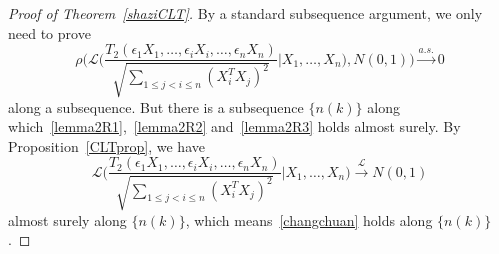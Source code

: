 \documentclass[review]{elsarticle}
\theoremstyle{plain}
\theoremstyle{definition}
\theoremstyle{remark}
\begin{document}
\begin{proof}[Proof of Theorem~\ref{shaziCLT}]
By a standard subsequence argument, we only need to prove 
    \begin{equation}\label{changchuan}
        \rho\Big(\mathcal{L}\Big(\frac{T_2(\epsilon_1 X_1,\ldots, \epsilon_i X_i,\ldots,\epsilon_n X_n)}{\sqrt{\sum_{1\leq j<i\leq n}{(X_i^T X_j)}^2}}\Big|X_1,\ldots,X_n\Big),N(0,1)\Big)\xrightarrow{a.s.} 0
    \end{equation}
     along a subsequence.
    But there is a subsequence $\{n(k)\}$ along which~\eqref{lemma2R1},~\eqref{lemma2R2} and~\eqref{lemma2R3} holds almost surely.
    By Proposition~\ref{CLTprop}, we have
    \begin{equation}
        \mathcal{L}\Big(\frac{T_2(\epsilon_1 X_1,\ldots, \epsilon_i X_i,\ldots,\epsilon_n X_n)}{\sqrt{\sum_{1\leq j<i\leq n}{(X_i^T X_j)}^2}}\Big|X_1,\ldots,X_n\Big)\xrightarrow{\mathcal{L}}N(0,1)
    \end{equation}
    almost surely along $\{n(k)\}$, which means~\eqref{changchuan} holds along $\{n(k)\}$.

\end{proof}
\end{document}
